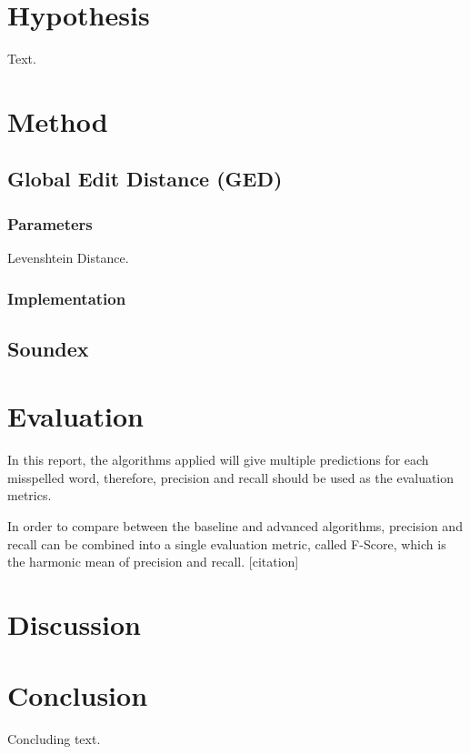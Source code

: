 \documentclass[11pt]{article}
\begin{document}
\section{Hypothesis}

Text.

\section{Method}


\subsection{Global Edit Distance (GED)}

\subsubsection{Parameters}

Levenshtein Distance.

\subsubsection{Implementation}



 
\subsection{Soundex}

\section{Evaluation}

\paragraph{} In this report, the algorithms applied will give multiple predictions for each misspelled word, therefore, precision and recall should be used as the evaluation metrics.

In order to compare between the baseline and advanced algorithms, precision and recall can be combined into a single evaluation metric, called F-Score, which is the harmonic mean of precision and recall. [citation]

\section{Discussion}


\section{Conclusion}

Concluding text.



\end{document}
